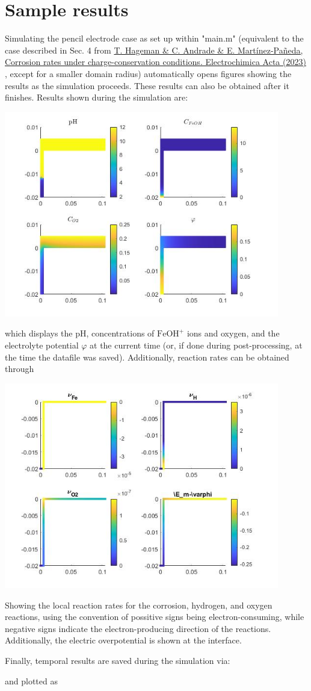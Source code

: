 \documentclass[3p]{elsarticle} %
\newcommand{\citeMe}{\href{https://doi.org/10.1016/j.electacta.2023.142624}{T. Hageman \& C. Andrade \& E. Martínez-Pañeda, Corrosion rates under charge-conservation conditions. Electrochimica Acta (2023)} \citep{Hageman2023}}
\begin{document}
\section{Sample results}
Simulating the pencil electrode case as set up within "main.m" (equivalent to the case described in Sec. 4 from \citeMe{}, except for a smaller domain radius) automatically opens figures showing the results as the simulation proceeds. These results can also be obtained after it finishes. Results shown during the simulation are:

\begin{center}
\includegraphics[width=12cm]{../Figures/Surfs.jpg}
\end{center}
which displays the pH, concentrations of $\mathrm{FeOH}^+$ ions and oxygen, and the electrolyte potential $\varphi$ at the current time (or, if done during post-processing, at the time the datafile was saved). Additionally, reaction rates can be obtained through

\begin{center}
\includegraphics[width=12cm]{../Figures/Rates.jpg}
\end{center}
Showing the local reaction rates for the corrosion, hydrogen, and oxygen reactions, using the convention of possitive signs being electron-consuming, while negative signs indicate the electron-producing direction of the reactions. Additionally, the electric overpotential is shown at the interface.

Finally, temporal results are saved during the simulation via:

and plotted as



\end{document}
